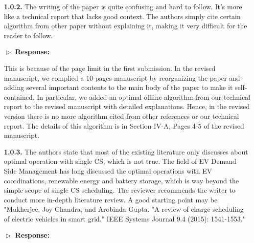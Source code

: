 \documentclass[11pt]{article}
\begin{document}
	\vspace{3mm}
{\color{blue}	
\textbf{1.0.2.} The writing of the paper is quite confusing and hard to follow. It's more like a technical report that lacks good context. The authors simply cite certain algorithm from other paper without explaining it, making it very difficult for the reader to follow.}

\vspace{3mm}
	$\vartriangleright$ \noindent\textbf{Response:} 
	
	This is because of the page limit in the first submission. 
	In the revised manuscript, we complied a 10-pages manuscript by reorganizing the paper and adding several important contents to the main body of the paper to make it self-contained. In particular, we added an optimal offline algorithm from our technical report to the revised manuscript with detailed explanations. Hence, in the revised version there is no more algorithm cited from other references or our technical report. The details of this algorithm is in Section IV-A, Pages 4-5 of the revised manuscript. 

\vspace{3mm}
{\color{blue}
\textbf{1.0.3.} The authors state that most of the existing literature only discusses about optimal operation with single CS, which is not true. The field of EV Demand Side Management has long discussed the optimal operations with EV coordinations, renewable energy and battery storage, which is way beyond the simple scope of single CS scheduling. The reviewer recommends the writer to conduct more in-depth literature review. A good starting point may be "Mukherjee, Joy Chandra, and Arobinda Gupta. "A review of charge scheduling of electric vehicles in smart grid." IEEE Systems Journal 9.4 (2015): 1541-1553."
}

\vspace{3mm}
	$\vartriangleright$ \noindent\textbf{Response:}
	
\end{document}
